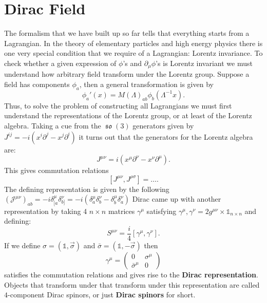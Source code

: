 \documentclass{report}
\theoremstyle{plain}
\theoremstyle{definition}
\theoremstyle{remark}
\newcommand{\FR}[2]{\frac{#1}{#2}}
\newcommand{\mc}{\mathcal}
\newcommand{\gam}{\gamma}
\newcommand{\sg}{\sigma}
\newcommand{\di}{\partial}
\newcommand{\iden}{\mathds{1}}
\DeclareMathOperator{\fso}{\mathfrak{so}}
\begin{document}
\section{Dirac Field}
The formalism that we have built up so far tells that everything
starts from a Lagrangian. In the theory of elementary particles and
high energy physics there is one very special condition that we
require of a Lagrangian: Lorentz invariance. To check whether a given
expression of $\phi$'s and $\di_\mu\phi$'s is Lorentz invariant we
must understand how arbitrary field transform under the Lorentz group.
Suppose a field has components $\phi_a$, then a general transformation
is given by
\[ \phi_a'(x) = M(\Lambda)_{ab}\phi_b(\Lambda^{-1}x). \]
Thus, to solve the problem of constructing all Lagrangians we must
first understand the representations of the Lorentz group, or at least
of the Lorentz algebra. Taking a cue from the $\fso(3)$ generators
given by $J^{ij}=-i(x^i\di^j-x^j\di^i)$ it turns out that the
generators for the Lorentz algebra are:
\[ J^{\mu\nu} = i(x^\mu\di^\nu-x^\nu\di^\mu).\]
This gives commutation relations
\[ [J^{\mu\nu},J^{\rho\sg}] = \dots .\]
The defining representation is given by the following$(\mc
J^{\mu\nu})_{ab} = -i\delta^\mu_{[a}\delta^\nu_{b]}
=-i(\delta^\mu_{a}\delta^\nu_{b} -\delta^\mu_{b}\delta^\nu_{a})$
Dirac came up with another representation by taking 4 $n\times n$ matrices
$\gam^\mu$ satisfying ${\gam^\mu,\gam^\nu} = 2g^{\mu\nu}\times
\iden_{n\times n}$ and defining:
\[ S^{\mu\nu} = \FR{i}{4}[\gam^\mu,\gam^\nu].\]
If we define $\sg = (\iden,\vec\sigma)$ and
$\bar\sg = (\iden,-\vec\sg)$ then
\[\gam^\mu = \begin{pmatrix}0&\sg^\mu\\\bar\sg^\mu&0 \end{pmatrix}\]
satisfies the commutation relations and gives rise to the
\textbf{Dirac representation}. Objects that transform under that
transform under this representation are called $4$-component Dirac
spinors, or just \textbf{Dirac spinors} for short.
\end{document}
